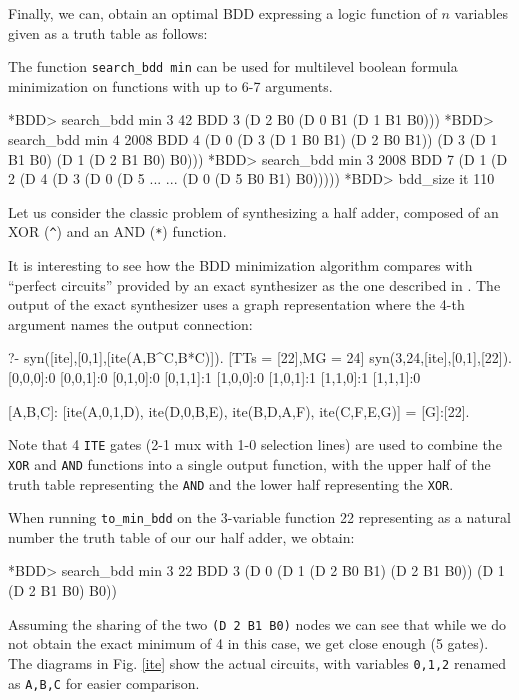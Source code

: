 \documentclass[]{INCLUDES/llncs}
\begin{document}
Finally, we can, obtain an optimal BDD expressing a logic function of $n$
variables given as a truth table as follows:
The function {\tt search\_bdd min}
can be used for multilevel 
boolean formula minimization on functions with
up to 6-7 arguments.
\begin{codex}
*BDD> search_bdd min 3 42
BDD 3 (D 2 B0 (D 0 B1 (D 1 B1 B0)))
*BDD> search_bdd min 4 2008
BDD 4 (D 0 (D 3 (D 1 B0 B1) (D 2 B0 B1)) 
           (D 3 (D 1 B1 B0) (D 1 (D 2 B1 B0) B0)))
*BDD> search_bdd min 3 2008
BDD 7 (D 1 (D 2 (D 4 (D 3 (D 0 (D 5 ...
      ... (D 0 (D 5 B0 B1) B0)))))
*BDD> bdd_size it
110
\end{codex}

Let us consider the classic problem of synthesizing a half adder, composed
of an XOR (\verb~^~) and an AND  (\verb~*~) function.

It is interesting to see how the BDD minimization algorithm compares with
``perfect circuits'' provided by an exact synthesizer 
as the one described in \cite{iclp07,cf08}.
The output of the exact synthesizer uses a graph representation where
the 4-th argument names the output connection: 
\begin{codex}
?- syn([ite],[0,1],[ite(A,B^C,B*C)]).
[TTs = [22],MG = 24]
syn(3,24,[ite],[0,1],[22]).
[0,0,0]:0
[0,0,1]:0
[0,1,0]:0
[0,1,1]:1
[1,0,0]:0
[1,0,1]:1
[1,1,0]:1
[1,1,1]:0

[A,B,C]:
   [ite(A,0,1,D),
    ite(D,0,B,E),
    ite(B,D,A,F),
    ite(C,F,E,G)] = [G]:[22].
\end{codex}
Note that 4 {\tt ITE} gates (2-1 mux with 1-0 selection lines) are used
to combine the {\tt XOR} and {\tt AND} functions into a single output
function, with the upper half of the truth table representing
the {\tt AND} and the lower half representing the {\tt XOR}.

When running {\tt to\_min\_bdd} on the 3-variable function 22 representing as a
natural number the truth table of our our half adder, we obtain:
\begin{codex}
*BDD> search_bdd min 3 22
BDD 3 (D 0 (D 1 (D 2 B0 B1) 
                (D 2 B1 B0)) 
           (D 1 (D 2 B1 B0) 
                 B0))
\end{codex}
Assuming the sharing of the two {\tt (D 2 B1 B0)} nodes we
can see that while we do not obtain the exact minimum of 4 in this case,
we get close enough (5 gates). The diagrams  in Fig. \ref{ite} show the
actual circuits, with variables {\tt 0,1,2} renamed as {\tt A,B,C} for easier
comparison.
\end{document}
